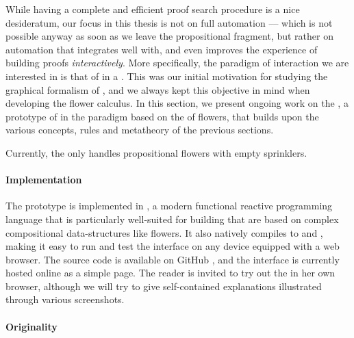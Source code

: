 \begin{scope}
While having a complete and efficient proof search procedure is a nice
desideratum, our focus in this thesis is not on full automation --- which is not
possible anyway as soon as we leave the propositional fragment, but rather on
automation that integrates well with, and even improves the experience of
building proofs \emph{interactively}. More specifically, the paradigm of
interaction we are interested in is that of \emph{} in a
. This was our initial motivation for studying the graphical formalism
of , and we always kept this objective in mind when developing the
flower calculus. In this section, we present ongoing work on the , a prototype of  in the  paradigm based on
the  of flowers, that builds upon the various concepts,
rules and metatheory of the previous sections.

\begin{remark}
Currently, the  only handles propositional flowers with empty
sprinklers.
\end{remark}

\paragraph{Implementation}

The prototype is implemented in  ,
a modern functional reactive programming language that is particularly
well-suited for building  that are based on complex compositional
data-structures like flowers. It also natively compiles to  and ,
making it easy to run and test the interface on any device equipped with a web
browser. The source code is available on GitHub \cite{flower-prover}, and the
interface is currently hosted online as a simple 
page.
The reader is invited to try out the  in her own browser, although
we will try to give self-contained explanations illustrated through various
screenshots.

\paragraph{Originality}


\end{scope}
